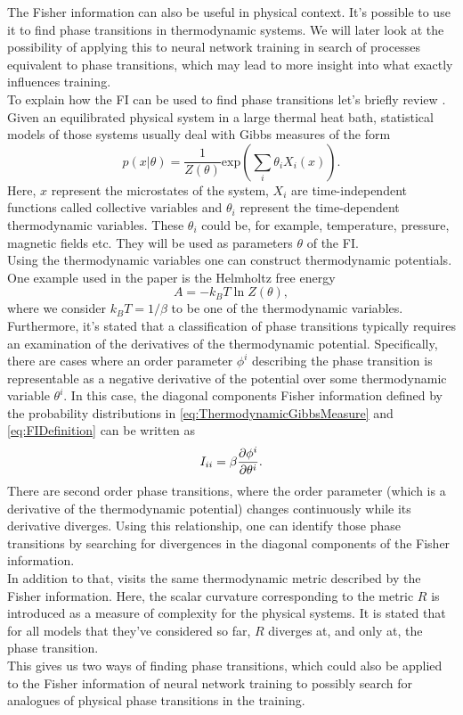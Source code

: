 The Fisher information can also be useful in physical context. It's possible to use it to find phase transitions in thermodynamic systems. We will later look at the possibility of applying this to neural network training in search of processes equivalent to phase transitions, which may lead to more insight into what exactly influences training.\\
To explain how the FI can be used to find phase transitions let's briefly review \cite{Prokopenko}.\\
Given an equilibrated physical system in a large thermal heat bath, statistical models of those systems usually deal with Gibbs measures of the form 
\begin{equation}\label{eq:ThermodynamicGibbsMeasure}
	p(x|\theta) = \frac{1}{Z(\theta)} \mathrm{exp}\left(\sum_i \theta_i X_i(x)\right).
\end{equation}
Here, $x$ represent the microstates of the system, $X_i$ are time-independent functions called collective variables and $\theta_i$ represent the time-dependent thermodynamic variables. These $\theta_i$ could be, for example, temperature, pressure, magnetic fields etc. They will be used as parameters $\theta$ of the FI.\\
Using the thermodynamic variables one can construct thermodynamic potentials. One example used in the paper is the Helmholtz free energy 
\begin{equation}
	A = - k_B T \ln Z(\theta),
\end{equation}
where we consider $k_B T = 1/\beta$ to be one of the thermodynamic variables. \\
Furthermore, it's stated that a classification of phase transitions typically requires an examination of the derivatives of the thermodynamic potential. Specifically, there are cases where an order parameter $\phi^i$ describing the phase transition is representable as a negative derivative of the potential over some thermodynamic variable $\theta^i$. In this case, the diagonal components Fisher information defined by the probability distributions in \cref{eq:ThermodynamicGibbsMeasure} and \cref{eq:FIDefinition} can be written as
\begin{equation}
	I_{ii} = \beta \frac{\partial\phi^i}{\partial\theta^i}.
\end{equation}
There are second order phase transitions, where the order parameter (which is a derivative of the thermodynamic potential) changes continuously while its derivative diverges. Using this relationship, one can identify those phase transitions by searching for divergences in the diagonal components of the Fisher information.\\
In addition to that, \cite{Janke} visits the same thermodynamic metric described by the Fisher information. Here, the scalar curvature corresponding to the metric $R$ is introduced as a measure of complexity for the physical systems. It is stated that for all models that they've considered so far, $R$ diverges at, and only at, the phase transition.\\
This gives us two ways of finding phase transitions, which could also be applied to the Fisher information of neural network training to possibly search for analogues of physical phase transitions in the training.